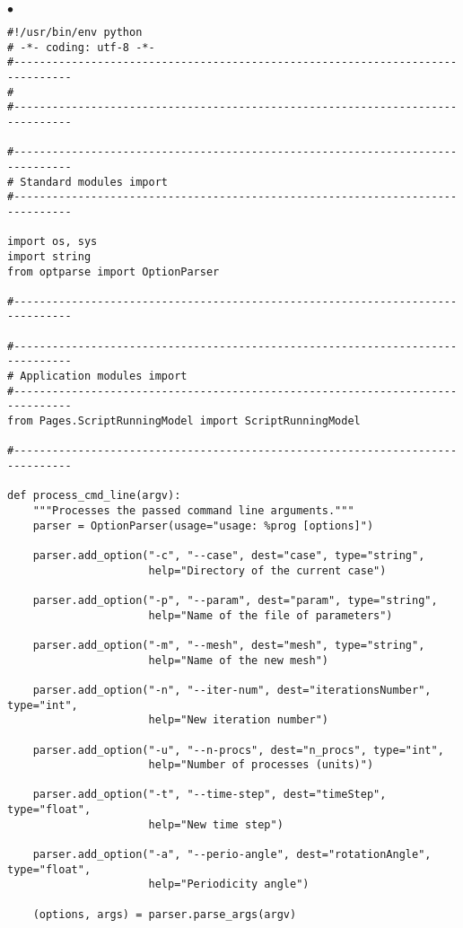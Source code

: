 \documentclass[a4paper,10pt,twoside]{csshortdoc}
\begin{document}
\begin{list}{$\bullet$}{}
\small
\begin{verbatim}
#!/usr/bin/env python
# -*- coding: utf-8 -*-
#-------------------------------------------------------------------------------
#
#-------------------------------------------------------------------------------

#-------------------------------------------------------------------------------
# Standard modules import
#-------------------------------------------------------------------------------

import os, sys
import string
from optparse import OptionParser

#-------------------------------------------------------------------------------

#-------------------------------------------------------------------------------
# Application modules import
#-------------------------------------------------------------------------------
from Pages.ScriptRunningModel import ScriptRunningModel

#-------------------------------------------------------------------------------

def process_cmd_line(argv):
    """Processes the passed command line arguments."""
    parser = OptionParser(usage="usage: %prog [options]")

    parser.add_option("-c", "--case", dest="case", type="string",
                      help="Directory of the current case")

    parser.add_option("-p", "--param", dest="param", type="string",
                      help="Name of the file of parameters")

    parser.add_option("-m", "--mesh", dest="mesh", type="string",
                      help="Name of the new mesh")

    parser.add_option("-n", "--iter-num", dest="iterationsNumber", type="int",
                      help="New iteration number")

    parser.add_option("-u", "--n-procs", dest="n_procs", type="int",
                      help="Number of processes (units)")

    parser.add_option("-t", "--time-step", dest="timeStep", type="float",
                      help="New time step")

    parser.add_option("-a", "--perio-angle", dest="rotationAngle", type="float",
                      help="Periodicity angle")

    (options, args) = parser.parse_args(argv)


\end{verbatim}
\end{list}
\end{document}

